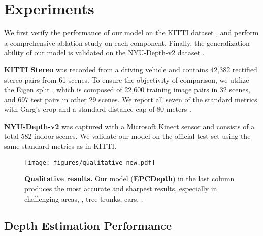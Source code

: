\documentclass[10pt,twocolumn,letterpaper]{article}
\begin{document}
\section{Experiments}

We first verify the performance of our model on the KITTI dataset \cite{Geiger2012}, 
and perform a comprehensive ablation study on each component. Finally, 
the generalization ability of our model is validated on the NYU-Depth-v2 
dataset \cite{silberman2012indoor}.

\noindent
{\bf KITTI Stereo} was recorded from a driving vehicle and 
contains 42,382 rectified stereo pairs from 61 scenes. To ensure the objectivity of 
comparison, we utilize the Eigen split 
\cite{Eigen2015}, which is composed of 22,600 training image pairs in 32 scenes, and 
697 test pairs in other 29 scenes. We report all seven of the standard metrics 
\cite{Eigen2014} with Garg's crop \cite{Garg2016} and a standard distance cap of 80 
meters \cite{Godard2017}.

\noindent
{\bf NYU-Depth-v2} was captured with a 
Microsoft Kinect sensor and consists of a total 582 indoor scenes. We validate our model 
on the official test set using the same standard metrics as in KITTI.

\begin{figure*}
   \begin{center}
      \texttt{[image: figures/qualitative\_new.pdf]}
   \end{center}
   \caption{{\bf Qualitative results.} Our model ({\bf EPCDepth}) in the last column produces the most 
   accurate and sharpest results, especially in challenging areas, \eg, tree trunks, 
   cars, \etc.}
   \label{fig:qualitative}
\end{figure*}

\subsection{Depth Estimation Performance}
\end{document}
